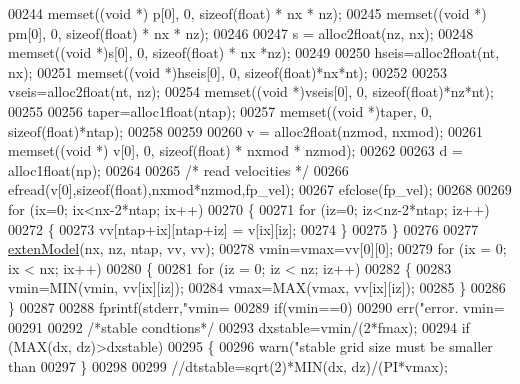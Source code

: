 \begin{DoxyCode}
{{00244     memset((\textcolor{keywordtype}{void} *) p[0], 0, \textcolor{keyword}{sizeof}(\textcolor{keywordtype}{float}) * nx * nz);
00245     memset((\textcolor{keywordtype}{void} *) pm[0], 0, \textcolor{keyword}{sizeof}(\textcolor{keywordtype}{float}) * nx * nz);
00246 
00247     s = alloc2float(nz, nx);
00248     memset((\textcolor{keywordtype}{void} *)s[0], 0, \textcolor{keyword}{sizeof}(\textcolor{keywordtype}{float}) * nx *nz);
00249 
00250     hseis=alloc2float(nt, nx);
00251     memset((\textcolor{keywordtype}{void} *)hseis[0], 0, \textcolor{keyword}{sizeof}(\textcolor{keywordtype}{float})*nx*nt);
00252 
00253     vseis=alloc2float(nt, nz);
00254     memset((\textcolor{keywordtype}{void} *)vseis[0], 0, \textcolor{keyword}{sizeof}(\textcolor{keywordtype}{float})*nz*nt);
00255 
00256     taper=alloc1float(ntap);
00257     memset((\textcolor{keywordtype}{void} *)taper, 0, \textcolor{keyword}{sizeof}(\textcolor{keywordtype}{float})*ntap);
00258 
00259 
00260     v = alloc2float(nzmod, nxmod);
00261     memset((\textcolor{keywordtype}{void} *) v[0], 0, \textcolor{keyword}{sizeof}(\textcolor{keywordtype}{float}) * nxmod * nzmod);
00262 
00263     d = alloc1float(np);
00264 
00265     \textcolor{comment}{/* read velocities */}
00266     efread(v[0],\textcolor{keyword}{sizeof}(\textcolor{keywordtype}{float}),nxmod*nzmod,fp\_vel);
00267     efclose(fp\_vel);
00268 
00269     \textcolor{keywordflow}{for} (ix=0; ix<nx-2*ntap; ix++)
00270     \{
00271         \textcolor{keywordflow}{for} (iz=0; iz<nz-2*ntap; iz++)
00272         \{
00273             vv[ntap+ix][ntap+iz] = v[ix][iz];
00274         \}
00275     \}
00276 
00277     \hyperlink{a00002_ad90abc83e502e0cf87b482e8a67bc9e3}{extenModel}(nx, nz, ntap, vv, vv);
00278     vmin=vmax=vv[0][0];
00279     \textcolor{keywordflow}{for} (ix = 0; ix < nx; ix++)
00280     \{
00281         \textcolor{keywordflow}{for} (iz = 0; iz < nz; iz++)
00282         \{
00283             vmin=MIN(vmin, vv[ix][iz]);
00284             vmax=MAX(vmax, vv[ix][iz]);
00285         \}
00286     \}
00287 
00288     fprintf(stderr,\textcolor{stringliteral}{"vmin=%
00289     \textcolor{keywordflow}{if}(vmin==0)
00290         err(\textcolor{stringliteral}{"error. vmin=%
00291 
00292     \textcolor{comment}{/*stable condtions*/}
00293     dxstable=vmin/(2*fmax);
00294     \textcolor{keywordflow}{if} (MAX(dx, dz)>dxstable)
00295     \{
00296         warn(\textcolor{stringliteral}{"stable grid size must be smaller than %
00297     \}
00298 
00299     \textcolor{comment}{//dtstable=sqrt(2)*MIN(dx, dz)/(PI*vmax);}
}}}}}
\end{DoxyCode}
